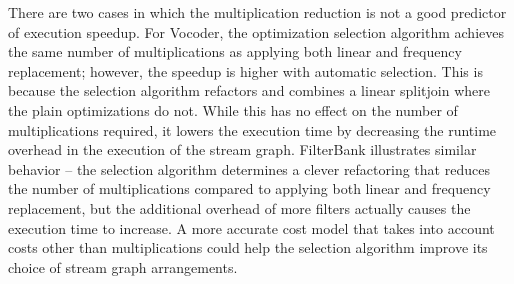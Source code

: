 There are two cases in which the multiplication reduction is not a
good predictor of execution speedup.  For Vocoder, the optimization
selection algorithm achieves the same number of multiplications as
applying both linear and frequency replacement; however, the speedup
is higher with automatic selection.  This is because the selection
algorithm refactors and combines a linear splitjoin where the plain
optimizations do not.  While this has no effect on the number of
multiplications required, it lowers the execution time by decreasing
the runtime overhead in the execution of the stream graph.  FilterBank
illustrates similar behavior -- the selection algorithm determines a
clever refactoring that reduces the number of multiplications compared
to applying both linear and frequency replacement, but the additional
overhead of more filters actually causes the execution time to
increase. A more accurate cost model that takes into account costs
other than multiplications could help the selection algorithm improve
its choice of stream graph arrangements.

